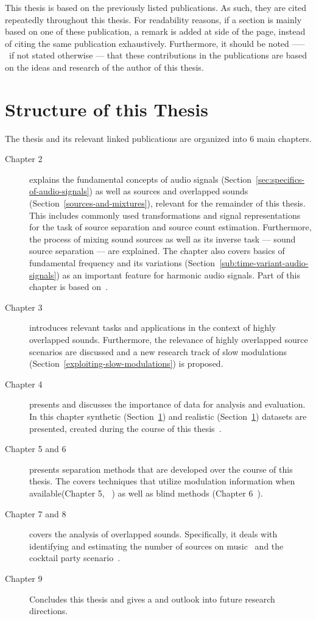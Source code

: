 This thesis is based on the previously listed publications. As such, they are cited repeatedly throughout this thesis. For readability reasons, if a section is mainly based on one of these publication, a remark is added at side of the page, instead of citing the same publication exhaustively. Furthermore, it should be noted ––– if not stated otherwise ---  that these contributions in the publications are based on the ideas and research of the author of this thesis.

\section{Structure of this Thesis}

The thesis and its relevant linked publications are organized into 6 main chapters.
\begin{description}
  \item[Chapter 2] explains the fundamental concepts of audio signals (Section~\ref{sec:specifics-of-audio-signals}) as well as sources and overlapped sounds (Section~\ref{sources-and-mixtures}), relevant for the remainder of this thesis. 
  This includes commonly used transformations and signal representations for the task of source separation and source count estimation.
  Furthermore, the process of mixing sound sources as well as its inverse task --- sound source separation --- are explained.
  The chapter also covers basics of fundamental frequency and its variations (Section~\ref{sub:time-variant-audio-signals}) as an important feature for harmonic audio signals.
  Part of this chapter is based on~\cite{rafii18}.
  \item[Chapter 3] introduces relevant tasks and applications in the context of highly overlapped sounds.
  Furthermore, the relevance of highly overlapped source scenarios are discussed and a new research track of slow  modulations (Section~\ref{exploiting-slow-modulations}) is proposed.
  \item[Chapter 4] presents and discusses the importance of data for analysis and evaluation.
  In this chapter synthetic (Section~\ref{}) and realistic (Section~\ref{}) datasets are presented, created during the course of this thesis~\cite{oss_wice, oss_unison, oss_libricount, liutkus17}.
  \item[Chapter 5 and 6] presents separation methods that are developed over the course of this thesis. 
  The covers techniques that utilize modulation information when available(Chapter 5, ~\cite{stoeter14, stoeter15acm, stoeter15icassp}) as well as blind methods (Chapter 6~\cite{stoeter16, liutkus17}).
  \item[Chapter 7 and 8] covers the analysis of overlapped sounds. Specifically, it deals with identifying and estimating the number of sources on music~\cite{schoeffler13, stoeter13} and the cocktail party scenario~\cite{stoeter19, stoeter18}.
  \item[Chapter 9] Concludes this thesis and gives a and outlook into future research directions.
\end{description}
